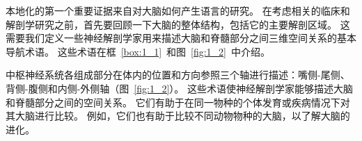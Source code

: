 本地化的第一个重要证据来自对大脑如何产生语言的研究。
在考虑相关的临床和解剖学研究之前，首先要回顾一下大脑的整体结构，包括它的主要解剖区域。
这需要我们定义一些神经解剖学家用来描述大脑和脊髓部分之间三维空间关系的基本导航术语。
这些术语在框~\ref{box:1_1}~和图~\ref{fig:1_2}~中介绍。


\begin{proposition}[神经解剖学导航术语] \label{box:1_1}
	
	\quad \quad 中枢神经系统各组成部分在体内的位置和方向参照三个轴进行描述：嘴侧-尾侧、背侧-腹侧和内侧-外侧轴（图~\ref{fig:1_2}）。
	这些术语使神经解剖学家能够描述大脑和脊髓部分之间的空间关系。
	它们有助于在同一物种的个体发育或疾病情况下对其大脑进行比较。
	例如，它们也有助于比较不同动物物种的大脑，以了解大脑的进化。

\end{proposition}


